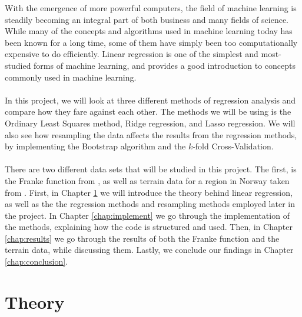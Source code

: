 \documentclass[a4paper]{article}
\begin{document}
With the emergence of more powerful computers, the field of machine learning is steadily becoming an integral part of both business and many fields of science. While many of the concepts and algorithms used in machine learning today has been known for a long time, some of them have simply been too computationally expensive to do efficiently. Linear regression is one of the simplest and most-studied forms of machine learning, and provides a good introduction to concepts commonly used in machine learning. 
\\\\
In this project, we will look at three different methods of regression analysis and compare how they fare against each other. The methods we will be using is the Ordinary Least Squares method, Ridge regression, and Lasso regression. We will also see how resampling the data affects the results from the regression methods, by implementing the Bootstrap algorithm and the $k$-fold Cross-Validation.
\\\\
There are two different data sets that will be studied in this project. The first, is the Franke function from \cite{Franke}, as well as terrain data for a region in Norway taken from \cite{terrain}. First, in Chapter \ref{chap:theory} we will introduce the theory behind linear regression, as well as the the regression methods and resampling methods employed later in the project. In Chapter \ref{chap:implement} we go through the implementation of the methods, explaining how the code is structured and used. Then, in Chapter \ref{chap:results} we go through the results of both the Franke function and the terrain data, while discussing them. %
Lastly, we conclude our findings in Chapter \ref{chap:conclusion}.

\section{Theory} \label{chap:theory}
\end{document}
